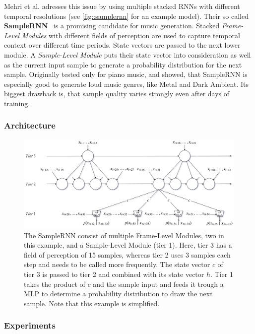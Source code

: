 \documentclass[12pt]{article}
\begin{document}
Mehri et al. adresses this issue by using multiple stacked RNNs with different temporal resolutions (see \ref{fig::samplernn} for an example model).
Their so called \textbf{SampleRNN}~\cite{mehri2016samplernn} is a promising candidate for music generation.
Stacked \emph{Frame-Level Modules} with different fields of perception are used to capture temporal context over different time periods.
State vectors are passed to the next lower module.
A \emph{Sample-Level Module} puts their state vector into consideration as well as the current input sample to generate a probability distribution for the next sample.
Originally tested only for piano music, \cite{zukowski2018generating} and \cite{carr2018generating} showed, that SampleRNN is especially good to generate loud music genres, like Metal and Dark Ambient.
Its biggest drawback is, that sample quality varies strongly even after days of training.




\subsubsection{Architecture}
\begin{figure}[ht]
    \label{fig:samplernn}
    \includegraphics[width=\textwidth]{img/samplernn.png}
    \caption{The SampleRNN consist of multiple Frame-Level Modules, two in this example, and a Sample-Level Module (tier 1). Here, tier 3 has a field of perception of 15 samples, whereas tier 2 uses 3 samples each step and needs to be called more frequently. The state vector $c$ of tier 3 is passed to tier 2 and combined with its state vector $h$. Tier 1 takes the product of $c$ and the sample input and feeds it trough a MLP to determine a probability distribution to draw the next sample. Note that this example is simplified. }
\end{figure}

\subsubsection{Experiments}
\end{document}

